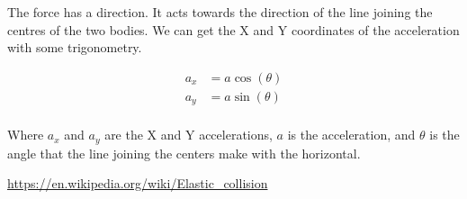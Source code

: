 \documentclass{amsart}
\begin{document}
The force has a direction. It acts towards the direction of the line joining
the centres of the two bodies. We can get the X and Y coordinates of the
acceleration with some trigonometry.

\begin{align*}
  a_x &= a \cos(\theta) \\
  a_y &= a \sin(\theta) \\
\end{align*}

Where \(a_x\) and \(a_y\) are the X and Y accelerations, \(a\) is the
acceleration, and \(\theta\) is the angle that the line joining the centers make
with the horizontal.

\fi

\begin{thebibliography}{9}
  \url{https://en.wikipedia.org/wiki/Elastic_collision}
\end{thebibliography}
\end{document}
